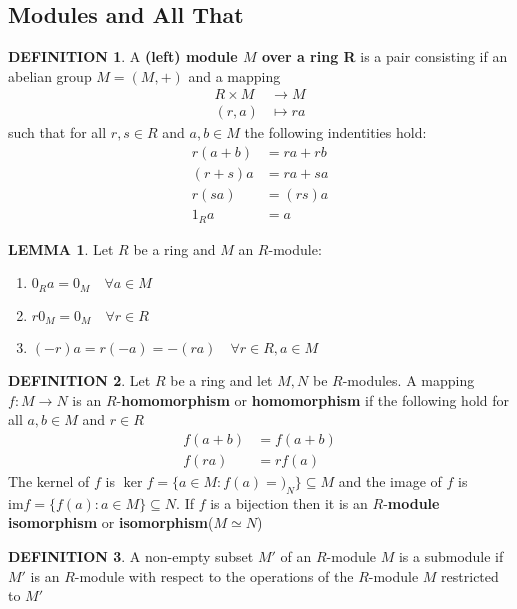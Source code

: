 \documentclass[10pt]{article}
\theoremstyle{definition}
\newtheorem{definition}{DEFINITION}[subsection]
\newcommand{\image}{\text{im}}
\newtheorem{lemma}{LEMMA}[subsection]
\begin{document}
\subsection{Modules and All That}
\begin{definition}
    A \textbf{(left) module $M$ over a ring R} is a pair consisting if an abelian group $M = (M, +)$ and a mapping
    \[\begin{split}
        R\times M &\rightarrow M\\
        (r,a) &\mapsto ra
    \end{split}\]
    such that for all $r,s \in R$ and $a,b \in M$ the following indentities hold:
    \[\begin{split}
        r(a+b) &= ra + rb\\
        (r+s)a &= ra + sa\\
        r(sa) &= (rs)a\\
        1_R a &= a
    \end{split}\]
\end{definition}

\begin{lemma}
    Let $R$ be a ring and $M$ an $R$-module:
    \begin{enumerate}
        \item $0_Ra = 0_M \quad \forall a \in M$
        \item $r0_M = 0_M \quad \forall r \in R$
        \item $(-r)a = r(-a) = -(ra) \quad \forall r\in R, a \in M$
    \end{enumerate}
\end{lemma}

\begin{definition}
    Let $R$ be a ring and let $M,N$ be $R$-modules. A mapping $f:M \rightarrow N$ is an $R$-\textbf{homomorphism} or \textbf{homomorphism} if the following hold for all $a,b \in M$ and $r \in R$
    \[\begin{split}
        f(a+b) &= f(a+b)\\
        f(ra) &= rf(a)
    \end{split}\]
    The kernel of $f$ is $\ker f  =\{a\in M:f(a)=)_N\} \subseteq M$ and the image of $f$ is $\image f = \{f(a):a\in M\}\subseteq N$. If $f$ is a bijection then it is an $R$-\textbf{module isomorphism} or \textbf{isomorphism}($M \simeq N$)
\end{definition}

\begin{definition}
    A non-empty subset $M'$ of an $R$-module $M$ is a submodule if $M'$ is an $R$-module with respect to the operations of the $R$-module $M$ restricted to $M'$
\end{definition}
\end{document}
